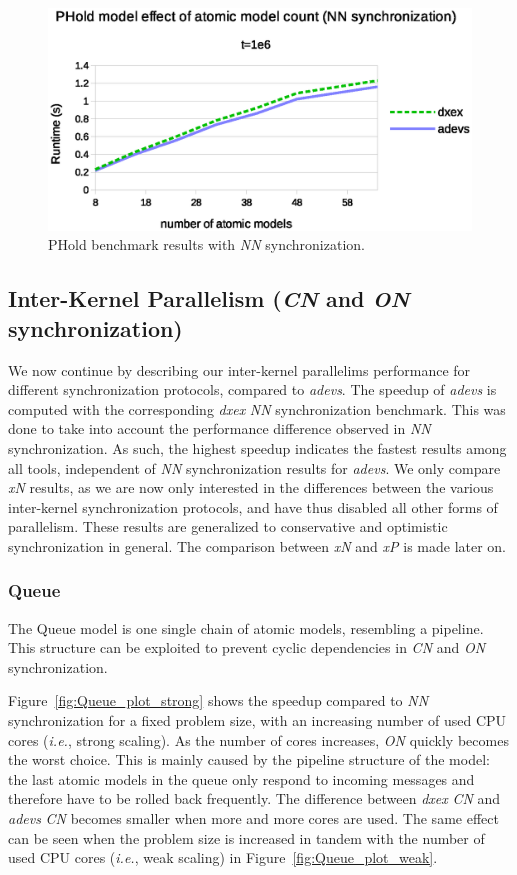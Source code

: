 \begin{figure}
	\center
	\includegraphics[width=\columnwidth]{fig/phold_sequential.eps}
	\caption{PHold benchmark results with \textit{NN} synchronization.}
	\label{fig:Phold_benchmark}
\end{figure}

\subsection{Inter-Kernel Parallelism (\textit{CN} and \textit{ON} synchronization)}
We now continue by describing our inter-kernel parallelims performance for different synchronization protocols, compared to \textit{adevs}.
The speedup of \textit{adevs} is computed with the corresponding \textit{dxex} \textit{NN} synchronization benchmark.
This was done to take into account the performance difference observed in \textit{NN} synchronization.
As such, the highest speedup indicates the fastest results among all tools, independent of \textit{NN} synchronization results for \textit{adevs}.
We only compare \textit{xN} results, as we are now only interested in the differences between the various inter-kernel synchronization protocols, and have thus disabled all other forms of parallelism.
These results are generalized to conservative and optimistic synchronization in general.
The comparison between \textit{xN} and \textit{xP} is made later on.

\subsubsection{Queue}
The Queue model is one single chain of atomic models, resembling a pipeline.
This structure can be exploited to prevent cyclic dependencies in \textit{CN} and \textit{ON} synchronization.

Figure~\ref{fig:Queue_plot_strong} shows the speedup compared to \textit{NN} synchronization for a fixed problem size, with an increasing number of used CPU cores (\textit{i.e.}, strong scaling).
As the number of cores increases, \textit{ON} quickly becomes the worst choice.
This is mainly caused by the pipeline structure of the model: the last atomic models in the queue only respond to incoming messages and therefore have to be rolled back frequently.
The difference between \textit{dxex} \textit{CN} and \textit{adevs} \textit{CN} becomes smaller when more and more cores are used.
The same effect can be seen when the problem size is increased in tandem with the number of used CPU cores (\textit{i.e.}, weak scaling) in Figure~\ref{fig:Queue_plot_weak}.

